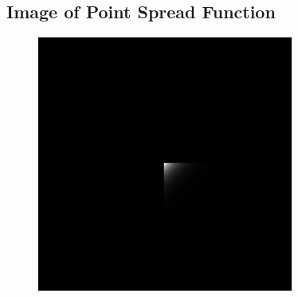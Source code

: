 \documentclass{article}
\begin{document}
\subsection{Image of Point Spread Function}
\begin{figure}[H]
    \centering
    \includegraphics[width=0.75\textwidth]{../results/h_out.png}
    \begin{center}
    \end{center}
\end{figure}
\end{document}
